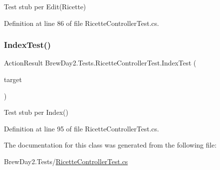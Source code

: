 Test stub per Edit(\+Ricette)



Definition at line 86 of file Ricette\+Controller\+Test.\+cs.

\mbox{\label{class_brew_day2_1_1_tests_1_1_ricette_controller_test_a71521a23a9ae6ba83625575420814c26}} 
\subsubsection{\texorpdfstring{Index\+Test()}{IndexTest()}}
{\footnotesize\ttfamily Action\+Result Brew\+Day2.\+Tests.\+Ricette\+Controller\+Test.\+Index\+Test (\begin{DoxyParamCaption}\item[{\mbox{[}\+Pex\+Assume\+Under\+Test\mbox{]} \mbox{\hyperlink{class_brew_day2_1_1_controllers_1_1_ricette_controller}{Ricette\+Controller}}}]{target }\end{DoxyParamCaption})}



Test stub per Index()



Definition at line 95 of file Ricette\+Controller\+Test.\+cs.



The documentation for this class was generated from the following file\+:\begin{DoxyCompactItemize}
\item 
Brew\+Day2.\+Tests/\mbox{\hyperlink{_ricette_controller_test_8cs}{Ricette\+Controller\+Test.\+cs}}\end{DoxyCompactItemize}
